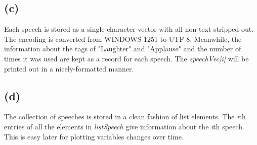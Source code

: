 \documentclass{article}
\begin{document}
\subsection*{(c)}

Each speech is stored as a single character vector with all non-text stripped out. The encoding is converted from
WINDOWS-1251 to UTF-8.
Meanwhile, the information about the tags of "Laughter" and "Applause" and the number of times it was used
are kept as a record for each speech. The \textit{speechVec[i]} will be printed out in a nicely-formatted manner. 



\subsection*{(d)}

The collection of speeches is stored in a clean fashion of list elements. The \textit{i}th entries of all the elements
in \textit{listSpeech} give information about the \textit{i}th speech. 
This is easy later for plotting variables changes over time.

\end{document}
